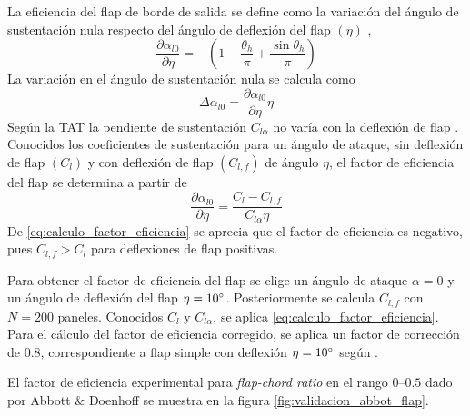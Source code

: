 La eficiencia del flap de borde de salida se define como la variación del ángulo de sustentación nula respecto del ángulo de deflexión del flap $\left( \eta \right)$ \cite{ortega},
\begin{equation}
    \frac{\partial \alpha_{l0}}{\partial \eta} = 
    - \left( 1 - \frac{\theta_h}{\pi} + \frac{\sin{\theta_h}}{\pi} \right)
\end{equation}
La variación en el ángulo de sustentación nula se calcula como
\begin{equation}
    \Delta \alpha_{l0} = \frac{\partial \alpha_{l0}}{\partial \eta} \eta
\end{equation}
Según la TAT la pendiente de sustentación $C_{l\alpha}$ no varía con la deflexión de flap \cite{ortega}. Conocidos los coeficientes de sustentación para un ángulo de ataque, sin deflexión de flap $\left( C_l \right)$ y con deflexión de flap $\left( C_{l,f} \right)$ de ángulo $\eta$, el factor de eficiencia del flap se determina a partir de 
\begin{equation} \label{eq:calculo_factor_eficiencia}
    \frac{\partial \alpha_{l0}}{\partial \eta} = 
    \frac{C_l - C_{l,f}}{C_{l\alpha} \eta}
\end{equation}
De \eqref{eq:calculo_factor_eficiencia} se aprecia que el factor de eficiencia es negativo, pues $C_{l,f} > C_l$ para deflexiones de flap positivas.

Para obtener el factor de eficiencia del flap se elige un ángulo de ataque $\alpha = 0$ y un ángulo de deflexión del flap $\eta = 10\mathrm{^{\circ}}$. Posteriormente se calcula $C_{l,f}$ con $N = 200$ paneles. Conocidos $C_l$ y $C_{l\alpha}$, se aplica \eqref{eq:calculo_factor_eficiencia}. Para el cálculo del factor de eficiencia corregido, se aplica un factor de corrección de $0.8$, correspondiente a flap simple con deflexión $\eta = 10\mathrm{^{\circ}}$ según \cite{mccormick_flap}.

El factor de eficiencia experimental para \emph{flap-chord ratio} en el rango $0$--$0.5$ dado por Abbott \& Doenhoff se muestra en la figura \ref{fig:validacion_abbot_flap}.

